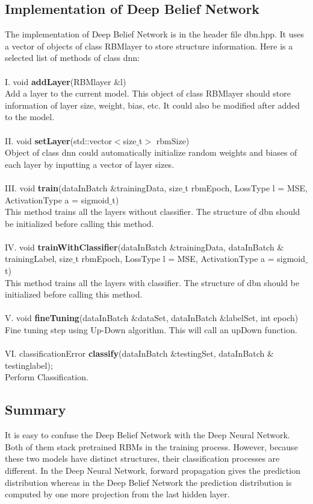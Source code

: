 \documentclass[12pt]{article}
\begin{document}
\subsection{Implementation of Deep Belief Network}
The implementation of Deep Belief Network is in the header file dbn.hpp. It uses a vector of objects of class RBMlayer to store structure information. Here is a selected list of methods of class dnn:\\
\\
I. void \textbf{addLayer}(RBMlayer $\&$l)\\
Add a layer to the current model. This object of class RBMlayer should store information of layer size, weight, bias, etc. It could also be modified after added to  the model.\\
\\
II. void \textbf{setLayer}(std::vector$<$size$\_$t$>$ rbmSize)\\
Object of class dnn could automatically initialize random weights and biases of each layer by inputting a vector of layer sizes.\\
\\
III. void \textbf{train}(dataInBatch $\&$trainingData, size$\_$t rbmEpoch, LossType l = MSE, ActivationType a = sigmoid$\_$t)\\
This method trains all the layers without classifier. The structure of dbn should be initialized before calling this method. \\
\\
IV. void \textbf{trainWithClassifier}(dataInBatch $\&$trainingData, dataInBatch $\&$trainingLabel, size$\_$t rbmEpoch, LossType l = MSE, ActivationType a = sigmoid$\_$t)\\
This method trains all the layers with classifier. The structure of dbn should be initialized before calling this method.\\
\\
V. void \textbf{fineTuning}(dataInBatch $\&$dataSet, dataInBatch $\&$labelSet, int epoch)\\
Fine tuning step using Up-Down algorithm. This will call an upDown function. \\
\\
VI. classificationError \textbf{classify}(dataInBatch $\&$testingSet, dataInBatch $\&$testinglabel);\\
Perform Classification.
\subsection{Summary}
It is easy to confuse the Deep Belief Network with the Deep Neural Network. Both of them stack pretrained RBMs in the training process. However, because these two models have distinct structures, their classification processes are different. In the Deep Neural Network, forward propagation gives the prediction distribution whereas in the Deep Belief Network the prediction distribution is computed by one more projection from the last hidden layer. 
\clearpage
\end{document}

